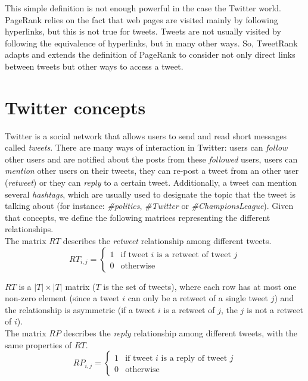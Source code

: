 \documentclass[12pt,a4paper]{article}
\begin{document}
This simple definition is not enough powerful in the case the Twitter world. PageRank relies on the fact that web pages are visited mainly by following hyperlinks, but this is not true for tweets. Tweets are not usually visited by following the equivalence of hyperlinks, but in many other ways. So, TweetRank adapts and extends the definition of PageRank to consider not only direct links between tweets but other ways to access a tweet.

\section{Twitter concepts}
Twitter is a social network that allows users to send and read short messages called \emph{tweets}. There are many ways of interaction in Twitter: users can \emph{follow} other users and are notified about the posts from these \emph{followed} users, users can \emph{mention} other users on their tweets, they can re-post a tweet from an other user (\emph{retweet}) or they can \emph{reply} to a certain tweet. Additionally, a tweet can mention several \emph{hashtags}, which are usually used to designate the topic that the tweet is talking about (for instance: \emph{\#politics}, \emph{\#Twitter} or \emph{\#ChampionsLeague}). Given that concepts, we define the following matrices representing the different relationships. \\



The matrix $RT$ describes the \emph{retweet} relationship among different tweets. 
\begin{equation}
RT_{i,j} = \begin{cases}
1 & \text{if tweet } i \text{ is a retweet of tweet } j \\
0 & \text{otherwise}
\end{cases}
\end{equation}

$RT$ is a $|T| \times |T|$ matrix ($T$ is the set of tweets), where each row has at most one non-zero element (since a tweet $i$ can only be a retweet of a single tweet $j$) and the relationship is asymmetric (if a tweet $i$ is a retweet of $j$, the $j$ is not a retweet of $i$). \\

The matrix $RP$ describes the \emph{reply} relationship among different tweets, with the same properties of $RT$.
\begin{equation}
RP_{i,j} = \begin{cases}
1 & \text{if tweet } i \text{ is a reply of tweet } j \\
0 & \text{otherwise}
\end{cases}
\end{equation}
\end{document}
